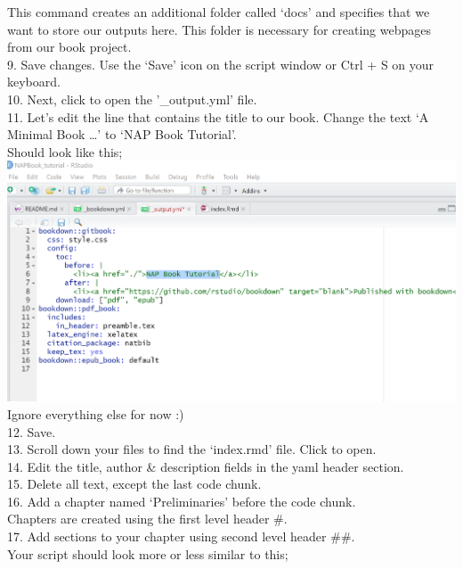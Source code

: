 \documentclass[
]{book}
\begin{document}
This command creates an additional folder called `docs' and specifies that we want to store our outputs here. This folder is necessary for creating webpages from our book project.\\
9. Save changes. Use the `Save' icon on the script window or Ctrl + S on your keyboard.\\
10. Next, click to open the '\_output.yml' file.\\
11. Let's edit the line that contains the title to our book. Change the text `A Minimal Book \ldots{}' to `NAP Book Tutorial'.\\
Should look like this;
\includegraphics{tutorial_screenshots/edit_title_output_yaml.png}\\
Ignore everything else for now :)\\
12. Save.\\
13. Scroll down your files to find the `index.rmd' file. Click to open.\\
14. Edit the title, author \& description fields in the yaml header section.\\
15. Delete all text, except the last code chunk.\\
16. Add a chapter named `Preliminaries' before the code chunk.\\
Chapters are created using the first level header \#.\\
17. Add sections to your chapter using second level header \#\#.\\
Your script should look more or less similar to this;
\end{document}

